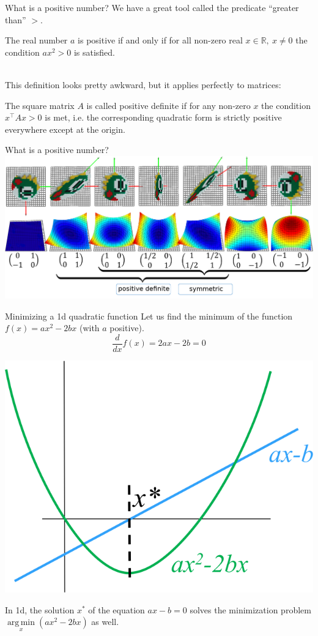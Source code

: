 \documentclass[UKenglish,aspectratio=169]{beamer}
\DeclareMathOperator*{\argmin}{arg\,min}
\begin{document}
\begin{frame}{What is a positive number?}
We have a great tool called the predicate ``greater than'' $>$.
\pause
\begin{definition}
The real number $a$ is positive if and only if for all non-zero real $x\in\mathbb R,\ x\neq 0$ the condition $ax^2>0$ is satisfied.
\end{definition}
\pause
~\\
This definition looks pretty awkward, but it applies perfectly to matrices:
\begin{definition}
The square matrix $A$ is called positive definite if for any non-zero $x$
the condition $x^\top A x > 0$ is met, i.e. the corresponding quadratic form is strictly positive everywhere except at the origin.
\end{definition}
\end{frame}

\begin{frame}{What is a positive number?}
\includegraphics[width=\linewidth]{../manuscript/img/matrices}
\end{frame}

\begin{frame}{Minimizing a 1d quadratic function}
Let us find the minimum of the function $f(x) = ax^2 - 2bx$ (with $a$ positive).
$$\frac{d}{dx}f(x) = 2ax - 2b = 0$$
\pause
\begin{center}
\includegraphics[width=.3\linewidth]{../manuscript/img/minpb1d}
\end{center}
In 1d, the solution $x^*$ of the equation $ax - b = 0$ solves the minimization problem $\argmin\limits_x(ax^2-2bx)$ as well.
\end{frame}
\end{document}
